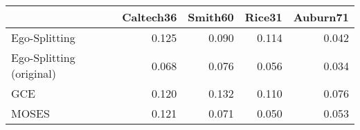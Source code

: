 \begin{tabular}{lrrrr}
\toprule
{} & Caltech36 & Smith60 & Rice31 & Auburn71 \\
\midrule
Ego-Splitting            &     0.125 &   0.090 &  0.114 &    0.042 \\
Ego-Splitting (original) &     0.068 &   0.076 &  0.056 &    0.034 \\
GCE                      &     0.120 &   0.132 &  0.110 &    0.076 \\
MOSES                    &     0.121 &   0.071 &  0.050 &    0.053 \\
\bottomrule
\end{tabular}
